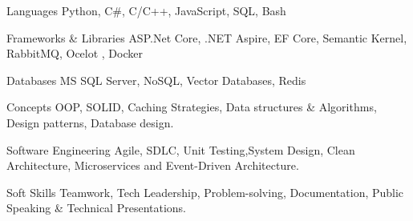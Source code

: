 

\begin{cvskills}

  \cvskill
    {Languages} %
    {Python, C\#, C/C++, JavaScript, SQL, Bash}

  \cvskill
    {Frameworks \& Libraries} %
    {ASP.Net Core, .NET Aspire, EF Core, Semantic Kernel, RabbitMQ, Ocelot , Docker}

  \cvskill
    {Databases} %
    {MS SQL Server, NoSQL, Vector Databases, Redis}

\cvskill
    {Concepts} %
    {OOP, SOLID, Caching Strategies, Data structures \& Algorithms, Design patterns, Database design. }

\cvskill
    {Software Engineering} %
    {Agile, SDLC, Unit Testing,System Design, Clean Architecture, Microservices and Event-Driven Architecture. }

  \cvskill
    {Soft Skills} %
    {Teamwork, Tech Leadership, Problem-solving, Documentation, Public Speaking \& Technical Presentations.} %

\end{cvskills}
 